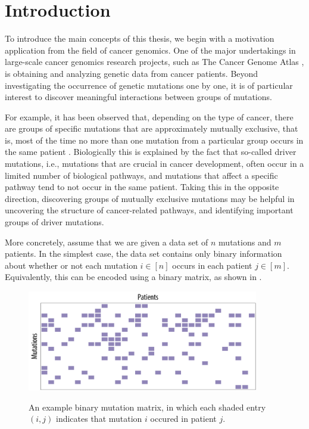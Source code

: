 \chapter{Introduction} \label{ch:intro}
To introduce the main concepts of this thesis, we begin with a motivation application from the field of cancer genomics.
One of the major undertakings in large-scale cancer genomics research projects, such as The Cancer Genome Atlas \citep{tcga}, is obtaining and analyzing genetic data from cancer patients.
Beyond investigating the occurrence of genetic mutations one by one, it is of particular interest to discover meaningful interactions between groups of mutations.

For example, it has been observed that, depending on the type of cancer, there are groups of specific mutations that are approximately mutually exclusive, that is, most of the time no more than one mutation from a particular group occurs in the same patient \citep{yeang08}.
Biologically this is explained by the fact that so-called driver mutations, i.e., mutations that are crucial in cancer development, often occur in a limited number of biological pathways, and mutations that affect a specific pathway tend to not occur in the same patient.
Taking this in the opposite direction, discovering groups of mutually exclusive mutations may be helpful in uncovering the structure of cancer-related pathways, and identifying important groups of driver mutations.

More concretely, assume that we are given a data set of $n$ mutations and $m$ patients.
In the simplest case, the data set contains only binary information about whether or not each mutation $i \in [n]$ occurs in each patient $j \in [m]$.
Equivalently, this can be encoded using a binary matrix, as shown in .

\begin{figure}[htb]
\centering
\includegraphics[width=0.9\textwidth]{figures/intro/example1.pdf}\\[1em]
\caption{An example binary mutation matrix, in which each shaded entry $(i, j)$ indicates that mutation $i$ occured in patient $j$.}
\label{fig:bamat_1}
\end{figure}

